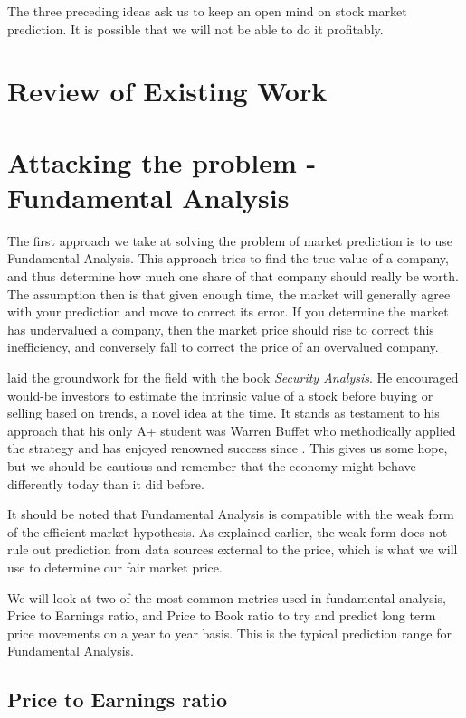 \documentclass{report}
\begin{document}
The three preceding ideas ask us to keep an open mind on stock market prediction. It is possible that we will not be able to do it profitably.

\chapter{Review of Existing Work}

\chapter{Attacking the problem - Fundamental Analysis}

The first approach we take at solving the problem of market prediction is to use Fundamental Analysis. This approach tries to find the true value of a company, and thus determine how much one share of that company should really be worth. The assumption then is that given enough time, the market will generally agree with your prediction and move to correct its error. If you determine the market has undervalued a company, then the market price should rise to correct this inefficiency, and conversely fall to correct the price of an overvalued company. 

\citet{graham1934security} laid the groundwork for the field with the book \textit{Security Analysis}. He encouraged would-be investors to estimate the intrinsic value of a stock before buying or selling based on trends, a novel idea at the time. It stands as testament to his approach that his only A+ student was Warren Buffet who methodically applied the strategy and has enjoyed renowned success since \cite{schroeder2008snowball}. This gives us some hope, but we should be cautious and remember that the economy might behave differently today than it did before.

It should be noted that Fundamental Analysis is compatible with the weak form of the efficient market hypothesis. As explained earlier, the weak form does not rule out prediction from data sources external to the price, which is what we will use to determine our fair market price.

We will look at two of the most common metrics used in fundamental analysis, Price to Earnings ratio, and Price to Book ratio to try and predict long term price movements on a year to year basis. This is the typical prediction range for Fundamental Analysis.

\section{Price to Earnings ratio}
\end{document}
